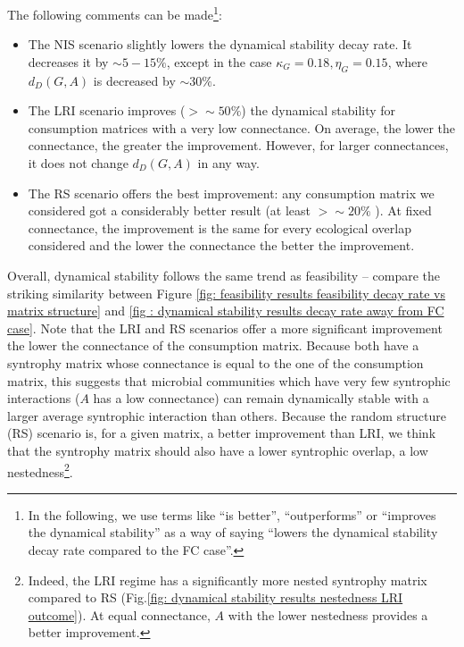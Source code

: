 \documentclass[12pt, titlepage]{report}
\begin{document}
The following comments can be made\footnote{In the following, we use terms like ``is better'', ``outperforms'' or ``improves the dynamical stability'' as a way of saying ``lowers the dynamical stability decay rate compared to the FC case''.}:
\begin{itemize}
\item The NIS scenario slightly lowers the dynamical stability decay rate. It decreases it by $\sim 5-15\%$, except in the case $\kappa_G = 0.18, \eta_G=0.15$, where $d_D(G,A)$ is decreased by $\sim 30\%$.
\item The LRI scenario improves ($> \sim 50\%$) the dynamical stability for consumption matrices with a very low connectance. On average, the lower the connectance, the greater the improvement. However, for larger connectances, it does not change $d_D(G,A)$ in any way.
\item The RS scenario offers the best improvement: any consumption matrix we considered got a considerably better result (at least $>\sim 20 \%$ ). At fixed connectance, the improvement is the same for every ecological overlap considered and the lower the connectance the better the improvement.
\end{itemize}
Overall, dynamical stability follows the same trend as feasibility -- compare the striking similarity between Figure \ref{fig: feasibility results feasibility decay rate vs matrix structure} and \ref{fig : dynamical stability results decay rate away from FC case}. Note that the LRI and RS scenarios offer a more significant improvement the lower the connectance of the consumption matrix. Because both have a syntrophy matrix whose connectance is equal to the one of the consumption matrix, this suggests that microbial communities which have very few syntrophic interactions (\ie $A$ has a low connectance) can remain dynamically stable with a larger average syntrophic interaction than others. Because the random structure (RS) scenario is, for a given matrix, a better improvement than LRI, we think that the syntrophy matrix should also have a lower syntrophic overlap, \ie a low nestedness\footnote{Indeed, the LRI regime has a significantly more nested syntrophy matrix compared to RS (Fig.\ref{fig: dynamical stability results nestedness LRI outcome}). At equal connectance, $A$ with the lower nestedness provides a better improvement.}.
\end{document}

